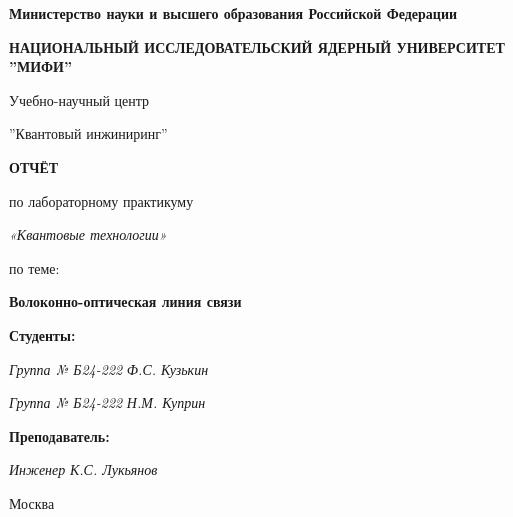 \documentclass[14pt,a4paper]{extarticle}
\numberwithin{equation}{section}
\numberwithin{figure}{section}
\numberwithin{table}{section}
\begin{document}
\begin{titlepage}
\thispagestyle{empty}
\begin{center}
    \textbf{Министерство науки и высшего образования Российской Федерации}
    
    \vspace{0.5cm}
    
    \textbf{НАЦИОНАЛЬНЫЙ ИССЛЕДОВАТЕЛЬСКИЙ ЯДЕРНЫЙ УНИВЕРСИТЕТ ''МИФИ''}
    
    \vspace{0.5cm}
    
    Учебно-научный центр
    
    ''Квантовый инжиниринг''
    
    \vspace{2cm}
    
    \textbf{ОТЧЁТ}
    
    по лабораторному практикуму
    
    \textit{«Квантовые технологии»}
    
    \vspace{0.5cm}
    
    по теме:
    
    \vspace{0.2cm}
    
    \textbf{Волоконно-оптическая линия связи}
    
    \vspace{3cm}
    
    \begin{flushleft}
        \textbf{Студенты:}
        
        \textit{Группа № Б24-222} \hfill \textit{Ф.С. Кузькин}
        
        \textit{Группа № Б24-222} \hfill \textit{Н.М. Куприн}

        
        \vspace{1cm}
        
        \textbf{Преподаватель:}
        
        \textit{Инженер} \hfill \textit{К.С. Лукьянов}
    \end{flushleft}
    
    \vfill
    
    Москва \the\year
\end{center}
\end{titlepage}

\setcounter{page}{2}
\end{document}
